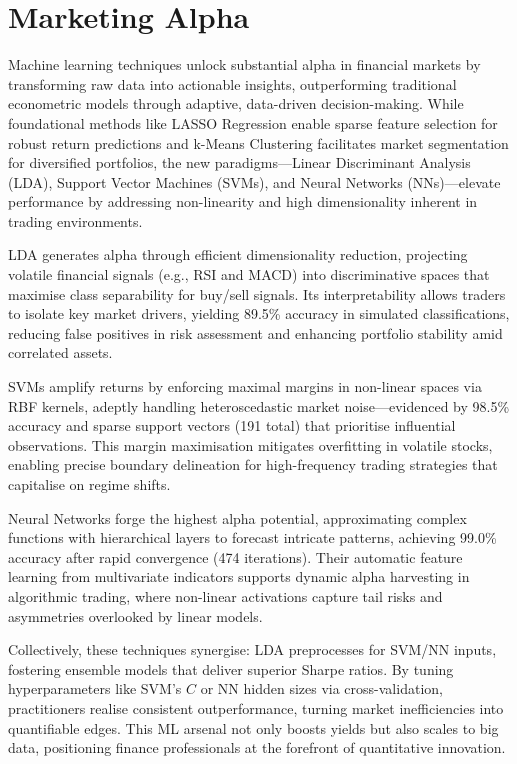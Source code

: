 \documentclass{article}
\begin{document}
\section{Marketing Alpha}

Machine learning techniques unlock substantial alpha in financial markets by transforming raw data into actionable insights, outperforming traditional econometric models through adaptive, data-driven decision-making. While foundational methods like LASSO Regression enable sparse feature selection for robust return predictions and k-Means Clustering facilitates market segmentation for diversified portfolios, the new paradigms—Linear Discriminant Analysis (LDA), Support Vector Machines (SVMs), and Neural Networks (NNs)—elevate performance by addressing non-linearity and high dimensionality inherent in trading environments.

LDA generates alpha through efficient dimensionality reduction, projecting volatile financial signals (e.g., RSI and MACD) into discriminative spaces that maximise class separability for buy/sell signals. Its interpretability allows traders to isolate key market drivers, yielding 89.5\% accuracy in simulated classifications, reducing false positives in risk assessment and enhancing portfolio stability amid correlated assets.

SVMs amplify returns by enforcing maximal margins in non-linear spaces via RBF kernels, adeptly handling heteroscedastic market noise—evidenced by 98.5\% accuracy and sparse support vectors (191 total) that prioritise influential observations. This margin maximisation mitigates overfitting in volatile stocks, enabling precise boundary delineation for high-frequency trading strategies that capitalise on regime shifts.

Neural Networks forge the highest alpha potential, approximating complex functions with hierarchical layers to forecast intricate patterns, achieving 99.0\% accuracy after rapid convergence (474 iterations). Their automatic feature learning from multivariate indicators supports dynamic alpha harvesting in algorithmic trading, where non-linear activations capture tail risks and asymmetries overlooked by linear models.

Collectively, these techniques synergise: LDA preprocesses for SVM/NN inputs, fostering ensemble models that deliver superior Sharpe ratios. By tuning hyperparameters like SVM's $C$ or NN hidden sizes via cross-validation, practitioners realise consistent outperformance, turning market inefficiencies into quantifiable edges. This ML arsenal not only boosts yields but also scales to big data, positioning finance professionals at the forefront of quantitative innovation.
\end{document}
